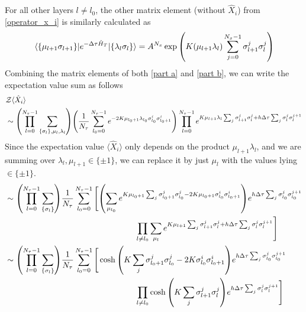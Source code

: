 \documentclass[../journal_main.tex]{subfiles}
\begin{document}
For all other layers $l \neq l_0$, the other matrix element (without $\hat{X}_i$) from \eqref{operator_x_i} is similarly calculated as 
\begin{equation}
    \mel{\{\mu_{l+1} \sigma _{l+1}\}}{e^{-\Delta \tau \hat{H}_T}}{\{\lambda_{l} \sigma _{l}\}} = A^{N_x}
    \exp\qty(K(\mu_{l + 1} \lambda_{l}) \sum_{j = 0}^{N_x-1} \sigma^j_{l+1} \sigma^j_{l})
    \label{part b}
\end{equation}
Combining the matrix elements of both \eqref{part a} and \eqref{part b}, we can write the expectation value sum as follows
\begin{align}
    & \mathcal{Z} \langle \hat{X}_i \rangle \nonumber \\
    & \sim  \qty(\prod_{l=0}^{N_\tau - 1} \sum_{\{\sigma_l \}, \mu_l, \lambda_l}) \qty(\frac{1}{N_\tau} \sum_{l_0 = 0}^{N_\tau - 1} e^{-2K \mu_{l_0 + 1} \lambda_{l_0} \sigma^{i}_{l_0} \sigma^{i}_{l_0 + 1}}) \prod_{l = 0}^{N_\tau - 1} e^{K \mu_{l+1} \lambda_l \sum_j \sigma^j_{l+1} \sigma ^j_l + h \Delta \tau \sum_j \sigma^j_l \sigma^{j+1}_l} \nonumber 
\end{align}
Since the expectation value $\langle \hat{X}_i \rangle$ only depends on the product $\mu_{l+1}\lambda_l$, and we are summing over $\lambda_l, \mu_{l+1} \in \{\pm 1\}$, we can replace it by just $\mu_l$ with the values lying $\in \{\pm 1\}$.
\begin{align}
    & \sim  \qty(\prod_{l=0}^{N_\tau - 1} \sum_{\{\sigma_l \}}) \frac{1}{N_\tau} \sum_{l_0 = 0}^{N_\tau - 1} \Bigg[\qty(\sum_{\mu_{l_0}} e^{K \mu_{l_0+1} \sum_j \sigma^j_{l_0+1} \sigma^j_{l_0} - 2K \mu_{l_0 + 1}  \sigma^{i}_{l_0} \sigma^{i}_{l_0 + 1}}) e^{ h \Delta \tau  \sum_j \sigma^j_{l_0} \sigma^{j+1}_{l_0}} \nonumber \\
    & \qquad\qquad\qquad\qquad\qquad\qquad\qquad\qquad\prod_{l \neq l_0} \sum_{\mu_{l}} e^{K \mu_{l+1} \sum_j \sigma^j_{l+1} \sigma ^j_l + h \Delta \tau  \sum_j \sigma^j_l \sigma^{j+1}_l} \Bigg] \nonumber \\
    & \sim \qty(\prod_{l=0}^{N_\tau - 1} \sum_{\{\sigma_l \}}) \frac{1}{N_\tau} \sum_{l_0 = 0}^{N_\tau - 1} \Bigg[ \cosh\qty(K \sum_j \sigma^j_{l_0+1} \sigma^j_{l_0} - 2K \sigma^{i}_{l_0} \sigma^{i}_{l_0 + 1}) e^{ h \Delta \tau  \sum_j \sigma^j_{l_0} \sigma^{j+1}_{l_0}} \nonumber \\
    &   \qquad\qquad\qquad\qquad\qquad\qquad\qquad\qquad\prod_{l \neq l_0} \cosh\qty(K \sum_j \sigma^j_{l+1} \sigma ^j_l) e^{h \Delta \tau  \sum_j \sigma^j_l \sigma^{j+1}_l} \Bigg] 
    \label{almostfinal}
\end{align}
\end{document}
